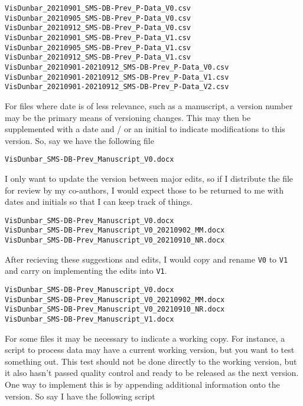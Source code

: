 \documentclass[
]{book}
\begin{document}
\begin{verbatim}
VisDunbar_20210901_SMS-DB-Prev_P-Data_V0.csv
VisDunbar_20210905_SMS-DB-Prev_P-Data_V0.csv
VisDunbar_20210912_SMS-DB-Prev_P-Data_V0.csv
VisDunbar_20210901_SMS-DB-Prev_P-Data_V1.csv
VisDunbar_20210905_SMS-DB-Prev_P-Data_V1.csv
VisDunbar_20210912_SMS-DB-Prev_P-Data_V1.csv
VisDunbar_20210901-20210912_SMS-DB-Prev_P-Data_V0.csv
VisDunbar_20210901-20210912_SMS-DB-Prev_P-Data_V1.csv
VisDunbar_20210901-20210912_SMS-DB-Prev_P-Data_V2.csv
\end{verbatim}

For files where date is of less relevance, such as a manuscript, a version number may be the primary means of versioning changes. This may then be supplemented with a date and / or an initial to indicate modifications to this version. So, say we have the following file

\begin{verbatim}
VisDunbar_SMS-DB-Prev_Manuscript_V0.docx
\end{verbatim}

I only want to update the version between major edits, so if I distribute the file for review by my co-authors, I would expect those to be returned to me with dates and initials so that I can keep track of things.

\begin{verbatim}
VisDunbar_SMS-DB-Prev_Manuscript_V0.docx
VisDunbar_SMS-DB-Prev_Manuscript_V0_20210902_MM.docx
VisDunbar_SMS-DB-Prev_Manuscript_V0_20210910_NR.docx
\end{verbatim}

After recieving these suggestions and edits, I would copy and rename \texttt{V0} to \texttt{V1} and carry on implementing the edits into \texttt{V1}.

\begin{verbatim}
VisDunbar_SMS-DB-Prev_Manuscript_V0.docx
VisDunbar_SMS-DB-Prev_Manuscript_V0_20210902_MM.docx
VisDunbar_SMS-DB-Prev_Manuscript_V0_20210910_NR.docx
VisDunbar_SMS-DB-Prev_Manuscript_V1.docx
\end{verbatim}

For some files it may be necessary to indicate a working copy. For instance, a script to process data may have a current working version, but you want to test something out. This test should not be done directly to the working version, but it also hasn't passed quality control and ready to be released as the next version. One way to implement this is by appending additional information onto the version. So say I have the following script
\end{document}
